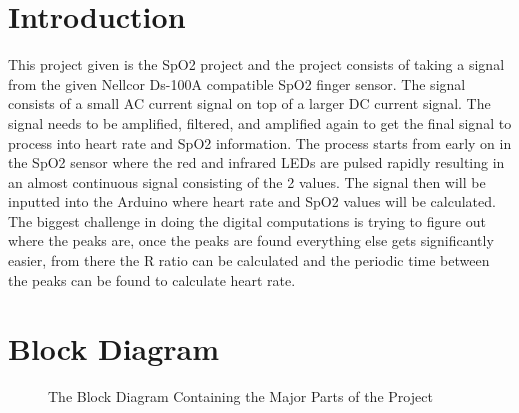 \documentclass{article}
\begin{document}
\maketitle
\newpage
\tableofcontents
\newpage
\section{Introduction}
This project given is the SpO2 project and the project consists of taking a signal from the given Nellcor Ds-100A compatible SpO2 finger sensor. The signal consists of a small AC current signal on top of a larger DC current signal. The signal needs to be amplified, filtered, and amplified again to get the final signal to process into heart rate and SpO2 information. The process starts from early on in the SpO2 sensor where the red and infrared LEDs are pulsed rapidly resulting in an almost continuous signal consisting of the 2 values. The signal then will be inputted into the Arduino where heart rate and SpO2 values will be calculated. The biggest challenge in doing the digital computations is trying to figure out where the peaks are, once the peaks are found everything else gets significantly easier, from there the R ratio can be calculated and the periodic time between the peaks can be found to calculate heart rate.


\section{Block Diagram}
\begin{figure}[h]
    \centering
    \caption{The Block Diagram Containing the Major Parts of the Project}
    \label{figure:BlockDiagram}
\end{figure}
\end{document}
